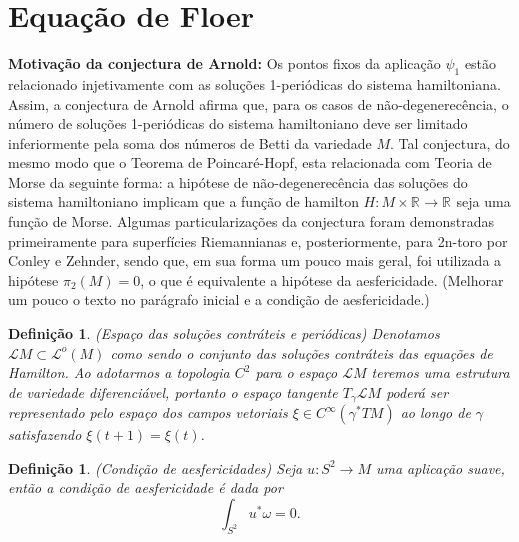 \documentclass[12pt]{book}
\newtheorem{definicao}[teorema]{Definição}
\newcommand{\caminhos}{\mathcal{L}}
\newcommand{\caminhosfechados}[1]{\caminhos^{o}(#1)}
\newcommand{\real}[1]{\mathbb{R}^{#1}}
\newcommand{\solucoesperiodicascontrateis}{\mathcal{L}M}
\newcommand{\vermelho}[1]{{\color{red}#1}}
\begin{document}
	\section{Equação de Floer}
	\textbf{Motivação da conjectura de Arnold:} Os pontos fixos da aplicação $\psi_{1}$ estão relacionado injetivamente com as soluções 1-periódicas do sistema hamiltoniana. Assim, a conjectura de Arnold afirma que, para os casos de não-degenerecência, o número de soluções 1-periódicas do sistema hamiltoniano deve ser limitado inferiormente pela soma dos números de Betti da variedade $M$. Tal conjectura, do mesmo modo que o Teorema de Poincaré-Hopf, esta relacionada com Teoria de Morse da seguinte forma: a hipótese de não-degenerecência das soluções do sistema hamiltoniano implicam que a função de hamilton $H: M \times \real{} \to \real{}$ seja uma função de Morse. Algumas particularizações da conjectura foram demonstradas primeiramente para superfícies Riemannianas e, posteriormente, para 2n-toro por Conley e Zehnder, sendo que, em sua forma um pouco mais geral, foi utilizada a hipótese $\pi_{2}(M)=0$, o que é equivalente a hipótese da aesfericidade.
	\vermelho{(Melhorar um pouco o texto no parágrafo inicial e a condição de aesfericidade.)}
	
	\begin{definicao}\label{definicao_solucoes_periodicas_contratei}
		(Espaço das soluções contráteis e periódicas) Denotamos $\solucoesperiodicascontrateis \subset \caminhosfechados{M}$ como sendo o conjunto das soluções contráteis das equações de Hamilton. Ao adotarmos a topologia $C^{2}$ para o espaço $\solucoesperiodicascontrateis$ teremos uma estrutura de variedade diferenciável, portanto o espaço tangente $T_{\gamma}\solucoesperiodicascontrateis$ poderá ser representado pelo espaço dos campos vetoriais $\xi \in  C^{\infty}(\gamma^{*}TM)$ ao longo de $\gamma$ satisfazendo $\xi(t+1) = \xi(t)$.
	\end{definicao}	
	
	\begin{definicao}
		(Condição de aesfericidades) Seja $u:S^{2} \to M$ uma aplicação suave, então a condição de aesfericidade é dada por 
		$$
		\int_{S^{2}} u^{*}\omega = 0.
		$$
	\end{definicao}
	
\end{document}
